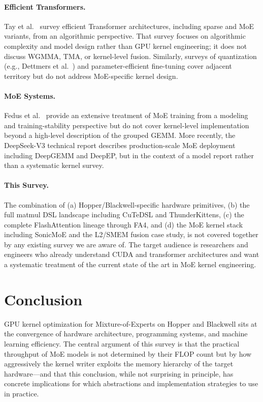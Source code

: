 \documentclass[10pt]{article}
\begin{document}
\paragraph{Efficient Transformers.} Tay et al.~\citep{tay2022efficient} survey efficient Transformer architectures, including sparse and MoE variants, from an algorithmic perspective. That survey focuses on algorithmic complexity and model design rather than GPU kernel engineering; it does not discuss WGMMA, TMA, or kernel-level fusion. Similarly, surveys of quantization (e.g., Dettmers et al.~\citep{dettmers2022int8}) and parameter-efficient fine-tuning cover adjacent territory but do not address MoE-specific kernel design.

\paragraph{MoE Systems.} Fedus et al.~\citep{fedus2022switch} provide an extensive treatment of MoE training from a modeling and training-stability perspective but do not cover kernel-level implementation beyond a high-level description of the grouped GEMM. More recently, the DeepSeek-V3 technical report \citep{liu2024deepseekv3} describes production-scale MoE deployment including DeepGEMM and DeepEP, but in the context of a model report rather than a systematic kernel survey.

\paragraph{This Survey.} The combination of (a) Hopper/Blackwell-specific hardware primitives, (b) the full matmul DSL landscape including CuTeDSL and ThunderKittens, (c) the complete FlashAttention lineage through FA4, and (d) the MoE kernel stack including SonicMoE and the L2/SMEM fusion case study, is not covered together by any existing survey we are aware of. The target audience is researchers and engineers who already understand CUDA and transformer architectures and want a systematic treatment of the current state of the art in MoE kernel engineering.

\section{Conclusion}
\label{sec:conclusion}

GPU kernel optimization for Mixture-of-Experts on Hopper and Blackwell sits at the convergence of hardware architecture, programming systems, and machine learning efficiency. The central argument of this survey is that the practical throughput of MoE models is not determined by their FLOP count but by how aggressively the kernel writer exploits the memory hierarchy of the target hardware---and that this conclusion, while not surprising in principle, has concrete implications for which abstractions and implementation strategies to use in practice.
\end{document}
